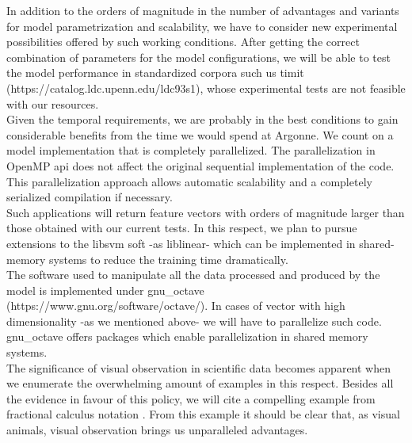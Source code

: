 \documentclass[11pt,a4paper]{article}
\begin{document}
In addition to the orders of magnitude in the number of advantages and variants for 
model parametrization and scalability, we have to consider new experimental
possibilities offered by such working conditions.
After getting the correct combination of parameters for the model configurations,
we will be able to test the model performance in standardized corpora such us
\gls{timit} (https://catalog.ldc.upenn.edu/ldc93s1), whose experimental tests
are not feasible with our resources. \\

Given the temporal requirements, we are probably in the best conditions to gain
considerable benefits from the time we would spend at Argonne.
We count on a model implementation that is completely parallelized. %
The parallelization in OpenMP \gls{api} does not affect the original sequential implementation
of the code. This parallelization approach allows automatic scalability and a completely serialized
compilation if necessary. \\

Such applications will return feature vectors with orders of magnitude larger than those obtained with our current tests.
In this respect, we plan to pursue extensions to the \gls{libsvm} soft -as \gls{liblinear}- which can be implemented in
shared-memory systems to reduce the training time dramatically. \\

The software used to manipulate all the data processed and produced by the model
is implemented under \gls{gnu_octave} (https://www.gnu.org/software/octave/).
In cases of vector with high dimensionality -as we mentioned above-
we will have to parallelize such code.
\gls{gnu_octave} offers packages which enable parallelization in shared memory systems. \\

The significance of visual observation in scientific data becomes apparent
when we enumerate the overwhelming amount of examples in this respect.
Besides all the evidence in favour of this policy, we will cite
a compelling example from fractional calculus notation \cite{Miller_1993}.
From this example it should be clear that, as visual animals,
visual observation brings us unparalleled advantages. \\

 \\
\end{document}
